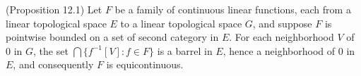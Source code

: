 (Proposition 12.1) Let $F$ be a family of continuous linear functions, each from a linear topological space $E$ to a linear topological space $G$, and suppose $F$ is pointwise bounded on a set of second category in $E$. For each neighborhood $V$ of $0$ in $G$, the set $\bigcap\{f^{-1}[V] : f \in F\}$ is a barrel in $E$, hence a neighborhood of $0$ in $E$, and consequently $F$ is equicontinuous.
